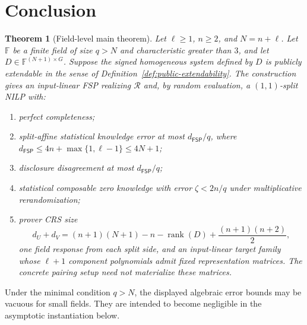 \documentclass[11pt]{article}
\newtheorem{theorem}{Theorem}[section]
\theoremstyle{definition}
\newcommand{\F}{\mathbb F}
\newcommand{\cR}{\mathcal R}
\newcommand{\FSP}{\mathsf{FSP}}
\begin{document}


\section{Conclusion}

\begin{theorem}[Field-level main theorem]
\label{thm:main}
Let $\ell\ge1$, $n\ge2$, and $N=n+\ell$.  Let $\F$ be a finite
field of size $q>N$ and characteristic greater than $3$, and let
$D\in\F^{(N+1)\times G}$.  Suppose the signed homogeneous system defined by
$D$ is publicly extendable in the sense of
Definition~\ref{def:public-extendability}.  The construction gives an
input-linear FSP realizing $\cR$ and, by random evaluation, a $(1,1)$-split
NILP with:
\begin{enumerate}[label=(\roman*)]
  \item perfect completeness;
  \item split-affine statistical knowledge error at most
  $d_{\FSP}/q$, where
  $d_{\FSP}\le4n+\max\{1,\ell-1\}\le4N+1$;
  \item disclosure disagreement at most $d_{\FSP}/q$;
  \item statistical composable zero knowledge with error $\zeta<2n/q$ under
  multiplicative rerandomization;
  \item prover CRS size
  \[
    d_U+d_V
    =(n+1)(N+1)-n-\operatorname{rank}(D)
      +\frac{(n+1)(n+2)}2,
  \]
  one field response from each split side, and an input-linear target family
  whose $\ell+1$ component polynomials admit fixed representation matrices.
  The concrete pairing setup need not materialize these matrices.
\end{enumerate}
\end{theorem}

Under the minimal condition $q>N$, the displayed algebraic error bounds may
be vacuous for small fields.  They are intended to become negligible in the
asymptotic instantiation below.
\end{document}

